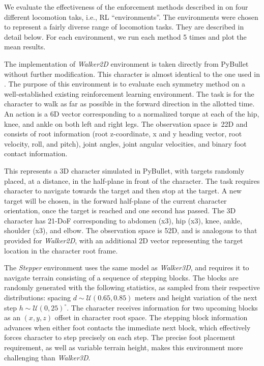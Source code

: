 We evaluate the effectiveness of the enforcement methods described in  
on four different locomotion taks, i.e., RL ``environments''.  
The environments were chosen to represent a fairly diverse range of locomotion tasks.  
They are described in detail below.  
For each environment, we run each method 5 times and plot the mean results.

 The implementation of {\it Walker2D} environment is taken directly from PyBullet \citep{ref:Pybullet} 
without further modification. This character is almost identical to the one used in . The purpose of this environment is to evaluate each symmetry method on 
a well-established existing reinforcement learning environment.  
The task is for the character to walk as far as possible in the forward direction in the allotted time.  
An action is a 6D vector corresponding to a normalized torque at each of the hip, knee, and ankle on both left and right legs.  
The observation space is~22D and consists of root information (root z-coordinate, x and y heading vector, root velocity, 
roll, and pitch), joint angles, joint angular velocities, and binary foot contact information.

  This represents a 3D character simulated in PyBullet, with targets randomly placed, at a distance,
in the half-plane in front of the character.  
The task requires character to navigate towards the target and then stop at the target.  
A new target will be chosen, in the forward half-plane of the current character orientation, 
once the target is reached and one second has passed.  
The 3D character has 21-DoF corresponding to abdomen (x3), hip (x3), knee, ankle, shoulder (x3), and elbow.  
The observation space is 52D, and is analogous to that provided for {\it Walker2D},
with an additional 2D vector representing the target location in the character root frame.

  The {\it Stepper} environment uses the same model as \textit{Walker3D}, and 
requires it to navigate terrain consisting of a sequence of stepping blocks.  
The blocks are randomly generated with the following statistics, as sampled from their respective distributions:
spacing $d \sim \mathcal{U}(0.65, 0.85)$ meters and height variation of the next step $h \sim \mathcal{U}(0, 25)^{\circ}$.  
The character receives information for two upcoming blocks as an $(x,y,z)$ offset in character root space.  
The stepping block information advances when either foot contacts the immediate next block, 
which effectively forces character to step precisely on each step.  
The precise foot placement requirement, as well as variable terrain height, makes this environment 
more challenging than \textit{Walker3D}.


